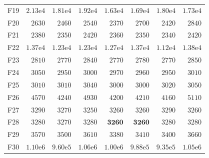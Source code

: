 \begin{tabular}{lrrrrrrr}
F19 & $2.13\mathrm{e}{4}$ & $1.81\mathrm{e}{4}$ & $1.92\mathrm{e}{4}$ & $1.63\mathrm{e}{4}$ & $1.69\mathrm{e}{4}$ & $1.80\mathrm{e}{4}$ & $1.73\mathrm{e}{4}$ \\
F20 & $2630$ & $2460$ & $2540$ & $2370$ & $2700$ & $2420$ & $2840$ \\
F21 & $2380$ & $2350$ & $2420$ & $2360$ & $2350$ & $2340$ & $2420$ \\
F22 & $1.37\mathrm{e}{4}$ & $1.23\mathrm{e}{4}$ & $1.23\mathrm{e}{4}$ & $1.27\mathrm{e}{4}$ & $1.37\mathrm{e}{4}$ & $1.12\mathrm{e}{4}$ & $1.38\mathrm{e}{4}$ \\
F23 & $2810$ & $2770$ & $2840$ & $2770$ & $2780$ & $2770$ & $2850$ \\
F24 & $3050$ & $2950$ & $3000$ & $2970$ & $2960$ & $2950$ & $3010$ \\
F25 & $3010$ & $3010$ & $3040$ & $3000$ & $3000$ & $3020$ & $3050$ \\
F26 & $4570$ & $4240$ & $4930$ & $4200$ & $4210$ & $4160$ & $5110$ \\
F27 & $3290$ & $3270$ & $3250$ & $3260$ & $3260$ & $3290$ & $3260$ \\
F28 & $3280$ & $3270$ & $3280$ & $\mathbf{3260}$ & $\mathbf{3260}$ & $3280$ & $3280$ \\
F29 & $3570$ & $3500$ & $3610$ & $3380$ & $3410$ & $3400$ & $3660$ \\
F30 & $1.10\mathrm{e}{6}$ & $9.60\mathrm{e}{5}$ & $1.06\mathrm{e}{6}$ & $1.00\mathrm{e}{6}$ & $9.88\mathrm{e}{5}$ & $9.35\mathrm{e}{5}$ & $1.05\mathrm{e}{6}$ \\
\bottomrule
\end{tabular}
